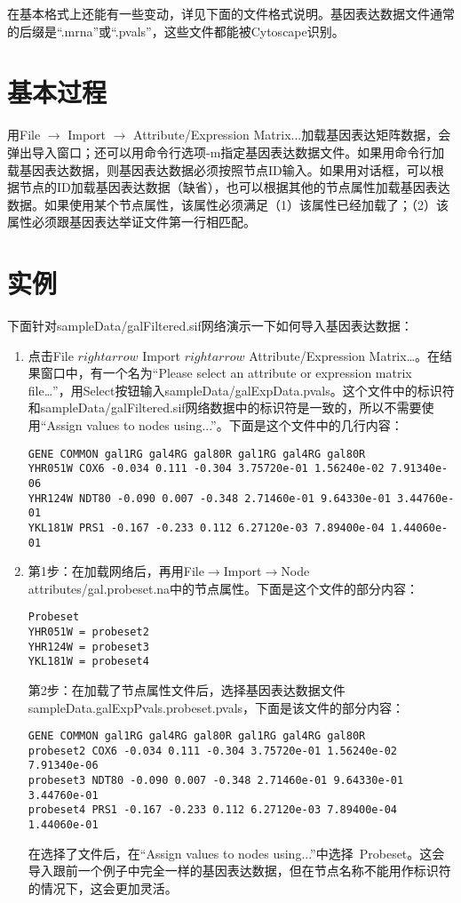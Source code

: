 在基本格式上还能有一些变动，详见下面的文件格式说明。基因表达数据文件通常的后缀是``.mrna''或``.pvals''，这些文件都能被Cytoscape识别。
\section{基本过程}
用File $\rightarrow$ Import $\rightarrow$ Attribute/Expression Matrix...加载基因表达矩阵数据，会弹出导入窗口；还可以用命令行选项-m指定基因表达数据文件。如果用命令行加载基因表达数据，则基因表达数据必须按照节点ID输入。如果用对话框，可以根据节点的ID加载基因表达数据（缺省），也可以根据其他的节点属性加载基因表达数据。如果使用某个节点属性，该属性必须满足（1）该属性已经加载了；（2）该属性必须跟基因表达举证文件第一行相匹配。
 
\section{实例}
下面针对sampleData/galFiltered.sif网络演示一下如何导入基因表达数据： 
\begin{enumerate}
\renewcommand{\labelenumi}{\textbf{Option \Alph{enumi}.}}
\item 点击File $rightarrow$ Import $rightarrow$ Attribute/Expression Matrix\ldots 。在结果窗口中，有一个名为``Please select an attribute or expression matrix file\ldots''，用Select按钮输入sampleData/galExpData.pvals。这个文件中的标识符和sampleData/galFiltered.sif网络数据中的标识符是一致的，所以不需要使用``Assign values to nodes using...''。下面是这个文件中的几行内容：
\begin{verbatim}
GENE COMMON gal1RG gal4RG gal80R gal1RG gal4RG gal80R
YHR051W COX6 -0.034 0.111 -0.304 3.75720e-01 1.56240e-02 7.91340e-06
YHR124W NDT80 -0.090 0.007 -0.348 2.71460e-01 9.64330e-01 3.44760e-01
YKL181W PRS1 -0.167 -0.233 0.112 6.27120e-03 7.89400e-04 1.44060e-01
\end{verbatim}
\item 第1步：在加载网络后，再用File$\rightarrow$Import$\rightarrow$Node attributes/gal.probeset.na中的节点属性。下面是这个文件的部分内容：
\begin{verbatim}
Probeset
YHR051W = probeset2
YHR124W = probeset3
YKL181W = probeset4
\end{verbatim}
第2步：在加载了节点属性文件后，选择基因表达数据文件sampleData.galExpPvals.probeset.pvals，下面是该文件的部分内容： 
 \begin{verbatim}
GENE COMMON gal1RG gal4RG gal80R gal1RG gal4RG gal80R
probeset2 COX6 -0.034 0.111 -0.304 3.75720e-01 1.56240e-02 7.91340e-06
probeset3 NDT80 -0.090 0.007 -0.348 2.71460e-01 9.64330e-01 3.44760e-01
probeset4 PRS1 -0.167 -0.233 0.112 6.27120e-03 7.89400e-04 1.44060e-01
\end{verbatim}
在选择了文件后，在``Assign values to nodes using...''中选择~Probeset。这会导入跟前一个例子中完全一样的基因表达数据，但在节点名称不能用作标识符的情况下，这会更加灵活。
\end{enumerate}
